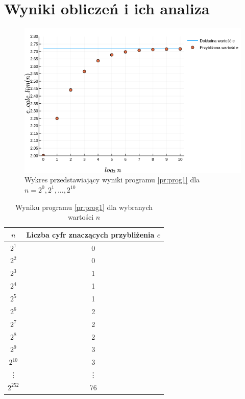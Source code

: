 \documentclass[12pt]{article}
\begin{document}
\section{Wyniki obliczeń i ich analiza}

\begin{figure}[H]
    \centering
    \includegraphics[scale=0.75]{plot1.png}
\caption{Wykres przedstawiający wyniki programu \ref{pr:prog1} dla $n = 2^0, 2^1, ..., 2^{10}$}
\label{figure:fig1}
\end{figure}

\begin{table}[H]
\centering
\begin{tabular}{|c|c|}
    \hline
    \large $n$ & \large Liczba cyfr znaczących przybliżenia $e$\normalsize\\
    \hline
    $2^1$    & 0  \\ \hline
    $2^2$    & 0  \\ \hline
    $2^3$    & 1  \\ \hline
    $2^4$    & 1  \\ \hline
    $2^5$    & 1  \\ \hline
    $2^6$    & 2  \\ \hline
    $2^7$    & 2  \\ \hline
    $2^8$    & 2  \\ \hline
    $2^9$    & 3  \\ \hline
    $2^{10}$ & 3  \\ \hline
    \vdots  & \vdots \\ \hline
    $2^{252}$& 76 \\ \hline
\end{tabular}
\caption{Wyniku programu \ref{pr:prog1} dla wybranych wartości $n$}
\label{table:prog1}
\end{table}
\end{document}
